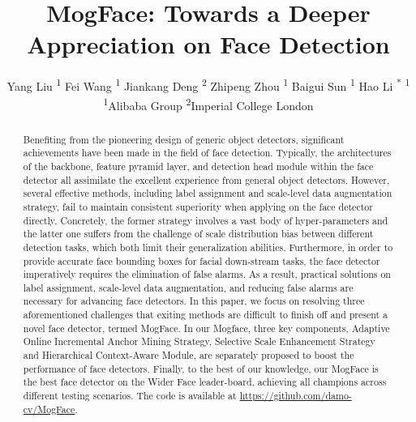 \documentclass[10pt,twocolumn,letterpaper]{article}
\newcommand*{\affaddr}[1]{#1}
\newcommand*{\affmark}[1][*]{\textsuperscript{#1}}
\begin{document}
\title{MogFace: Towards a Deeper Appreciation on Face Detection }



\author{
Yang Liu \affmark[1] \quad 
Fei Wang \affmark[1] \quad
Jiankang Deng \affmark[2] \quad
Zhipeng Zhou \affmark[1] \quad
Baigui Sun \affmark[1] \quad
Hao Li \textsuperscript{*} \affmark[1] \quad \\
\affaddr{\affmark[1]Alibaba Group} \qquad
\affaddr{\affmark[2]Imperial College London} \qquad \\
}

\maketitle


\begin{abstract}
Benefiting from the pioneering design of generic object detectors, significant achievements have been made in the field of face detection.
Typically, the architectures of the backbone, feature pyramid layer, and detection head module within the face detector all assimilate the excellent experience from general object detectors. 
However, several effective methods,  including label assignment and scale-level data augmentation strategy, fail to maintain consistent superiority when applying on the face detector directly. 
Concretely, the former strategy involves a vast body of hyper-parameters  and the latter one suffers from the challenge of scale distribution bias between different detection tasks, which both limit their generalization abilities.
Furthermore, in order to provide accurate face bounding boxes for facial down-stream tasks, the face detector imperatively requires the elimination of false alarms.
As a result, practical solutions on label assignment, scale-level data augmentation, and reducing false alarms are necessary for advancing face detectors. 
In this paper, we focus on resolving three aforementioned challenges that exiting methods are difficult to finish off and present a novel face detector, termed MogFace. In our Mogface, three key components, Adaptive Online Incremental Anchor Mining Strategy, Selective Scale Enhancement Strategy and Hierarchical Context-Aware Module, are separately proposed to boost the performance of face detectors.
Finally, 
to the best of our knowledge, our MogFace is the best face detector on the Wider Face leader-board, achieving all champions across different testing scenarios. The code is available at \url{https://github.com/damo-cv/MogFace}.
\end{abstract} 
\end{document}
